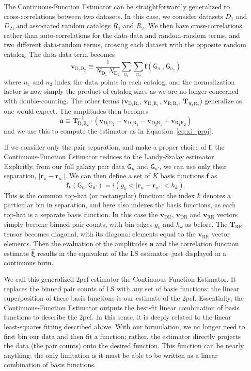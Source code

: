 \documentclass[modern]{aastex62}
\newcommand{\cf}{2pcf\xspace} %
\newcommand{\Est}{The Continuous-Function Estimator\xspace}
\newcommand{\est}{the Continuous-Function Estimator\xspace}
\newcommand{\LS}{LS\xspace}
\newcommand{\inv}{^{-1}}
\newcommand{\bld}[1]{\bm{#1}} %
\newcommand{\vv}[1]{\bld{v}_\mathrm{#1}}
\newcommand{\TT}[1]{\bld{T}_\mathrm{#1}}
\newcommand{\ff}{\bld{f}}
\newcommand{\NN}[1]{N_\mathrm{#1}}
\newcommand{\GG}[1]{\mathsf{G}_{#1}}
\begin{document}
\Est can be straightforwardly generalized to cross-correlations between two datasets.
In this case, we consider datasets $D_1$ and $D_2$, and associated random catalogs $R_1$ and $R_2$. 
We then have cross-correlations rather than auto-correlations for the data-data and random-random terms, and two different data-random terms, crossing each dataset with the opposite random catalog. 
The data-data term becomes 
\begin{equation}
    \vv{D_1 D_2} \equiv \frac{1}{\NN{D_1}\,\NN{D_2}} \sum_{n_1} \sum_{n_2} \ff(\GG{n_1}, \GG{n_2})
\end{equation}
where $n_1$ and $n_2$ index the data points in each catalog, and the normalization factor is now simply the product of catalog sizes as we are no longer concerned with double-counting.
The other terms ($\vv{D_1 R_2}$, $\vv{D_2 R_1}$, $\vv{R_1 R_2}$, $\TT{R_1 R_2}$) generalize as one would expect.
The amplitudes then becomes
\begin{equation}\displaystyle
    \bld{a} \equiv \TT{R_1 R_2}\inv \cdot (\vv{D_1 D_2} - \vv{D_1 R_2} - \vv{D_2 R_1} + \vv{R_1 R_2})
 \end{equation}
and we use this to compute the estimator as in Equation~\ref{eq:xi_proj}.

If we consider only the pair separation, and make a proper choice of $\ff$, \est reduces to the Landy-Szalay estimator.
Explicitly, from our full galaxy pair data $\GG{n}$ and $\GG{n'}$, we can use only their separation,  $|\bld{r}_n - \bld{r}_{n'}|$.
We can then define a set of $K$ basis functions $\ff$ as
\begin{equation}
\ff_k(\GG{n}, \GG{n'}) =  i(g_k < |\bld{r}_n - \bld{r}_{n'}| < h_k).
\end{equation}
This is the common top-hat (or rectangular) function; the index $k$ denotes a particular bin in separation, and here also indexes the basis functions, as each top-hat is a separate basis function.
In this case the $\vv{DD}$, $\vv{DR}$ and $\vv{RR}$ vectors simply become binned pair counts, with bin edges $g_k$ and $h_k$ as before.
The $\TT{RR}$ tensor becomes diagonal, with its diagonal elements equal to the $\vv{RR}$ vector elements.
Then the evaluation of the amplitudes $\bld{a}$ and the correlation function estimate $\bld{\hat{\xi}}$ results in the equivalent of the \LS estimator--just displayed in a continuous form.

We call this generalized \cf estimator \est.
It replaces the binned pair counts of \LS with any set of basis functions; the linear superposition of these basis functions is our estimate of the \cf.
Essentially, \est outputs the best-fit linear combination of basis functions to describe the \cf.
In this sense, it is deeply related to the linear least-squares fitting described above.
With our formulation, we no longer need to first bin our data and then fit a function; rather, the estimator directly projects the data (the pair counts) onto the desired function.
This function can be nearly anything; the only limitation is it must be able to be written as a linear combination of basis functions.
\end{document}
